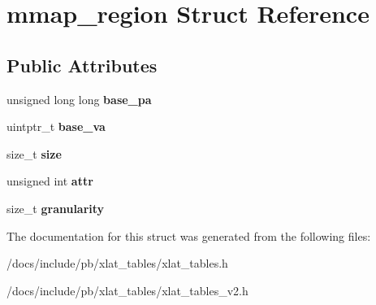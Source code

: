 \hypertarget{structmmap__region}{}\section{mmap\+\_\+region Struct Reference}
\label{structmmap__region}
\subsection*{Public Attributes}
\begin{DoxyCompactItemize}
\item 
\mbox{\label{structmmap__region_aa504eb9a95df5f3c2b25d1ade584baac}} 
unsigned long long {\bfseries base\+\_\+pa}
\item 
\mbox{\label{structmmap__region_aef965e3a5c0314f09c73099fd9591d27}} 
uintptr\+\_\+t {\bfseries base\+\_\+va}
\item 
\mbox{\label{structmmap__region_af65c54f482b71203d92c84986c498b71}} 
size\+\_\+t {\bfseries size}
\item 
\mbox{\label{structmmap__region_a9c19a01be7bde3f5216f2c314ec37ddb}} 
unsigned int {\bfseries attr}
\item 
\mbox{\label{structmmap__region_adec7918c33da9cffab49de41946a299a}} 
size\+\_\+t {\bfseries granularity}
\end{DoxyCompactItemize}


The documentation for this struct was generated from the following files\+:\begin{DoxyCompactItemize}
\item 
/docs/include/pb/xlat\+\_\+tables/xlat\+\_\+tables.\+h\item 
/docs/include/pb/xlat\+\_\+tables/xlat\+\_\+tables\+\_\+v2.\+h\end{DoxyCompactItemize}

